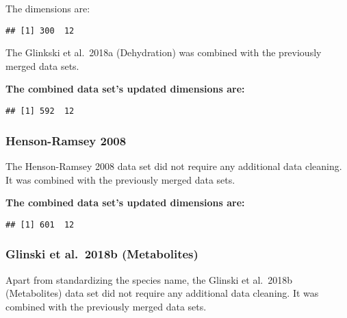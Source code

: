 \documentclass[
]{article}
\newenvironment{Shaded}{\begin{snugshade}}{\end{snugshade}}
\newcommand{\CommentTok}[1]{\textcolor[rgb]{0.56,0.35,0.01}{\textit{#1}}}
\newcommand{\KeywordTok}[1]{\textcolor[rgb]{0.13,0.29,0.53}{\textbf{#1}}}
\newcommand{\NormalTok}[1]{#1}
\newcommand{\OperatorTok}[1]{\textcolor[rgb]{0.81,0.36,0.00}{\textbf{#1}}}
\newcommand{\StringTok}[1]{\textcolor[rgb]{0.31,0.60,0.02}{#1}}
\begin{document}
The dimensions are:

\begin{verbatim}
## [1] 300  12
\end{verbatim}

The Glinkski et al.~2018a (Dehydration) was combined with the previously
merged data sets.

\textbf{The combined data set's updated dimensions are:}

\begin{verbatim}
## [1] 592  12
\end{verbatim}

\hypertarget{henson-ramsey-2008-1}{%
\subsubsection{Henson-Ramsey 2008}\label{henson-ramsey-2008-1}}

The Henson-Ramsey 2008 data set did not require any additional data
cleaning. It was combined with the previously merged data sets.

\textbf{The combined data set's updated dimensions are:}

\begin{verbatim}
## [1] 601  12
\end{verbatim}

\hypertarget{glinski-et-al.-2018b-metabolites-1}{%
\subsubsection{Glinski et al.~2018b
(Metabolites)}\label{glinski-et-al.-2018b-metabolites-1}}

Apart from standardizing the species name, the Glinski et al.~2018b
(Metabolites) data set did not require any additional data cleaning. It
was combined with the previously merged data sets.

\begin{Shaded}
\end{Shaded}
\end{document}

